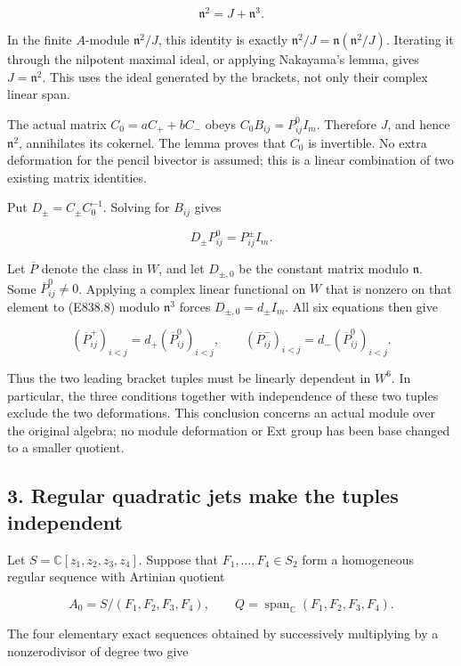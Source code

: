 \[
 \mathfrak n^2=J+\mathfrak n^3.
 \tag{E838.7}
\]

In the finite \(A\)-module \(\mathfrak n^2/J\), this identity is exactly
\(\mathfrak n^2/J=\mathfrak n(\mathfrak n^2/J)\). Iterating it through
the nilpotent maximal ideal, or applying Nakayama's lemma, gives
\(J=\mathfrak n^2\). This uses the ideal generated by the brackets, not
only their complex linear span.

The actual matrix \(C_0=aC_++bC_-\) obeys \(C_0B_{ij}=P^0_{ij}I_m\).
Therefore \(J\), and hence \(\mathfrak n^2\), annihilates its cokernel.
The lemma proves that \(C_0\) is invertible. No extra deformation for
the pencil bivector is assumed; this is a linear combination of two
existing matrix identities.

Put \(D_\pm=C_\pm C_0^{-1}\). Solving for \(B_{ij}\) gives

\[
 D_\pm P^0_{ij}=P^\pm_{ij}I_m.
 \tag{E838.8}
\]

Let \(\overline P\) denote the class in \(W\), and let \(D_{\pm,0}\) be
the constant matrix modulo \(\mathfrak n\). Some
\(\overline P^0_{ij}\ne0\). Applying a complex linear functional on
\(W\) that is nonzero on that element to (E838.8) modulo
\(\mathfrak n^3\) forces \(D_{\pm,0}=d_\pm I_m\). All six equations then
give

\[
 (\overline P^+_{ij})_{i<j}=d_+(\overline P^0_{ij})_{i<j},
 \qquad
 (\overline P^-_{ij})_{i<j}=d_-(\overline P^0_{ij})_{i<j}.
 \tag{E838.9}
\]

Thus the two leading bracket tuples must be linearly dependent in
\(W^6\). In particular, the three conditions together with independence
of these two tuples exclude the two deformations. This conclusion
concerns an actual module over the original algebra; no module
deformation or Ext group has been base changed to a smaller quotient.

\subsection{3. Regular quadratic jets make the tuples
independent}\label{regular-quadratic-jets-make-the-tuples-independent}

Let \(S=\mathbb C[z_1,z_2,z_3,z_4]\). Suppose that
\(F_1,\ldots,F_4\in S_2\) form a homogeneous regular sequence with
Artinian quotient

\[
 A_0=S/(F_1,F_2,F_3,F_4),\qquad
 Q=\operatorname{span}_{\mathbb C}(F_1,F_2,F_3,F_4).
 \tag{E838.10}
\]

The four elementary exact sequences obtained by successively multiplying
by a nonzerodivisor of degree two give


